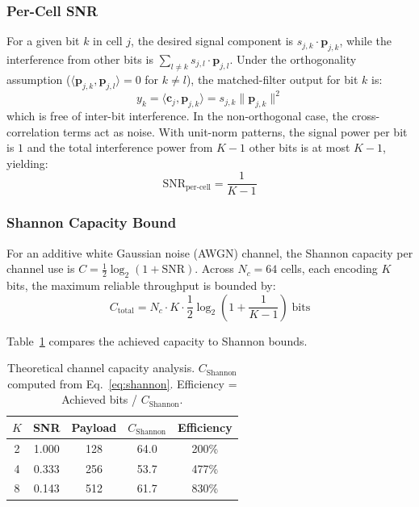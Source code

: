 \documentclass[conference]{IEEEtran}
\begin{document}
\subsubsection{Per-Cell SNR}
For a given bit $k$ in cell $j$, the desired signal component is $s_{j,k} \cdot \mathbf{p}_{j,k}$, while the interference from other bits is $\sum_{l \neq k} s_{j,l} \cdot \mathbf{p}_{j,l}$.
Under the orthogonality assumption ($\langle \mathbf{p}_{j,k}, \mathbf{p}_{j,l} \rangle = 0$ for $k \neq l$), the matched-filter output for bit $k$ is:
\begin{equation}
    y_k = \langle \mathbf{c}_j, \mathbf{p}_{j,k} \rangle = s_{j,k} \|\mathbf{p}_{j,k}\|^2
\end{equation}
which is free of inter-bit interference.
In the non-orthogonal case, the cross-correlation terms act as noise.
With unit-norm patterns, the signal power per bit is $1$ and the total interference power from $K-1$ other bits is at most $K-1$, yielding:
\begin{equation}
    \text{SNR}_\text{per-cell} = \frac{1}{K - 1}
\end{equation}

\subsubsection{Shannon Capacity Bound}
For an additive white Gaussian noise (AWGN) channel, the Shannon capacity per channel use is $C = \frac{1}{2}\log_2(1 + \text{SNR})$.
Across $N_c = 64$ cells, each encoding $K$ bits, the maximum reliable throughput is bounded by:
\begin{equation}
    C_\text{total} = N_c \cdot K \cdot \frac{1}{2} \log_2\!\left(1 + \frac{1}{K-1}\right) \;\text{bits}
    \label{eq:shannon}
\end{equation}

Table~\ref{tab:capacity_theory} compares the achieved capacity to Shannon bounds.

\begin{table}[t]
\centering
\caption{Theoretical channel capacity analysis. $C_\text{Shannon}$ computed from Eq.~\ref{eq:shannon}. Efficiency = Achieved bits / $C_\text{Shannon}$.}
\label{tab:capacity_theory}
\small
\begin{tabular}{@{}ccccc@{}}
\toprule
\textbf{$K$} & \textbf{SNR} & \textbf{Payload} & \textbf{$C_\text{Shannon}$} & \textbf{Efficiency} \\
\midrule
2 & 1.000 & 128 & 64.0 & 200\% \\
4 & 0.333 & 256 & 53.7 & 477\% \\
8 & 0.143 & 512 & 61.7 & 830\% \\
\bottomrule
\end{tabular}
\end{table}
\end{document}
